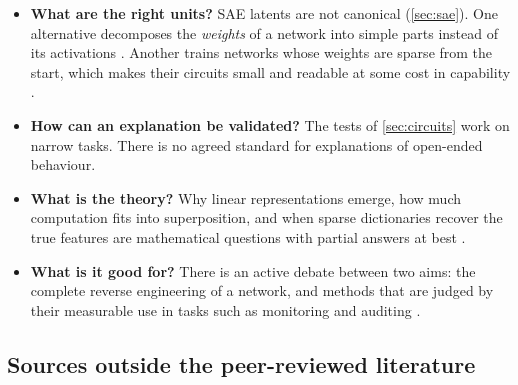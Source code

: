 \begin{itemize}
\item \textbf{What are the right units?} SAE latents are not canonical (\cref{sec:sae}). One alternative
decomposes the \emph{weights} of a network into simple parts instead of its activations
\citep{braun2025interpretability,bushnaq2025stochastic}. Another trains networks whose weights are sparse from
the start, which makes their circuits small and readable at some cost in capability \citep{gao2025weight}.
\item \textbf{How can an explanation be validated?} The tests of \cref{sec:circuits} work on narrow tasks. There
is no agreed standard for explanations of open-ended behaviour.
\item \textbf{What is the theory?} Why linear representations emerge, how much computation fits into
superposition, and when sparse dictionaries recover the true features are mathematical questions with partial
answers at best \citep{park2024linear,hanni2024mathematical,adler2024complexity}.
\item \textbf{What is it good for?} There is an active debate between two aims: the complete reverse engineering
of a network, and methods that are judged by their measurable use in tasks such as monitoring and auditing
\citep{nanda2025pragmatic,marks2025auditing}.
\end{itemize}

\subsection{Sources outside the peer-reviewed literature}

